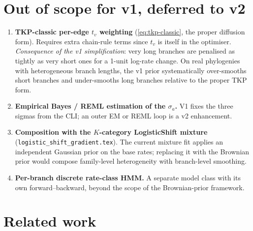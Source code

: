 \documentclass[11pt]{article}
\newcommand{\edgelen}{t}               %
\theoremstyle{definition}
\begin{document}
\section{Out of scope for v1, deferred to v2}
\label{sec:future}

\begin{enumerate}[leftmargin=*]
\item \textbf{TKP-classic per-edge $\edgelen_v$ weighting}
  (\eqref{eq:tkp-classic}, the proper diffusion form). Requires extra
  chain-rule terms since $\edgelen_v$ is itself in the optimiser.
  \emph{Consequence of the v1 simplification}: very long branches are
  penalised as tightly as very short ones for a 1-unit log-rate
  change. On real phylogenies with heterogeneous branch lengths, the
  v1 prior systematically over-smooths short branches and
  under-smooths long branches relative to the proper TKP form.
\item \textbf{Empirical Bayes / REML estimation of the $\sigma_a$.}
  V1 fixes the three sigmas from the CLI; an outer EM or REML loop
  is a v2 enhancement.
\item \textbf{Composition with the $K$-category LogisticShift mixture}
  (\texttt{logistic\_shift\_gradient.tex}). The current mixture fit
  applies an independent Gaussian prior on the base rates; replacing
  it with the Brownian prior would compose family-level heterogeneity
  with branch-level smoothing.
\item \textbf{Per-branch discrete rate-class HMM.} A separate model
  class with its own forward--backward, beyond the scope of the
  Brownian-prior framework.
\end{enumerate}

\section{Related work}
\end{document}
